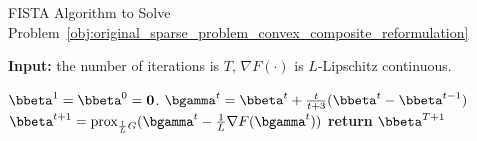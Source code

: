 \begin{algorithm}
\caption{FISTA Algorithm to Solve Problem~\eqref{obj:original_sparse_problem_convex_composite_reformulation}}
\label{alg:FISTA_algorithm}
\begin{flushleft}
\textbf{Input:} the number of iterations is $T$,  $\nabla F(\cdot)$ is $L$-Lipschitz continuous.\\
\end{flushleft}
\begin{algorithmic}[1]
    \STATE $\bbeta^1 = \bbeta^0 = \mathbf{0}$. 
        \STATE $\bgamma^t = \bbeta^t + \frac{t}{t+3} (\bbeta^t - \bbeta^{t-1})$ 
        \STATE $\bbeta^{t+1} = \text{prox}_{\frac{1}{L}G}(\bgamma^t - \frac{1}{L} \nabla F(\bgamma^t))$  \label{alg_line:FISTA_algorithm_proximal_gradient_descent}
    \ENDFOR
    \STATE \textbf{return} $\bbeta^{T+1}$
\end{algorithmic}
\end{algorithm}
